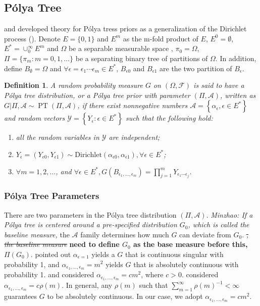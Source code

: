 \documentclass[12pt]{article}
\newtheorem{deff}[thm]{Definition}
\newcommand{\polya}{P\'{o}lya}
\DeclareMathOperator{\pt}{PT}
\begin{document}
\subsection{\polya{} Tree}
\citep{lavine1992, lavine1994} and \citep{mauldin1992} developed theory for
\polya{} tress priors as a generalization of the Dirichlet
process (\citep{ferguson1974}). Denote $E=\{0,1\}$ and $E^m$ as the m-fold
product of $E$, $E^0= \emptyset$, $E^{*} = \cup_0^{\infty} E^m$ and $\Omega$ be a separable
measurable space , $\pi_0 = \Omega$, $\Pi= \{ \pi_m: m=0,1, \ldots \}
$ be a separating binary tree of partitions of $\Omega$. In addition,
define $B_{\emptyset} = \Omega$ and $\forall \epsilon=\epsilon_1\cdots
\epsilon_m \in E^{*}$, $B_{\epsilon 0}$ and $B_{\epsilon 1}$ are the
two partition of $B_{\epsilon}$.
\begin{deff}
  A random probability measure $G$ on $(\Omega, \mathcal{F})$ is said to
  have a \polya{} tree distribution, or a \polya{} tree prior with
  parameter $(\Pi, \mathcal{A})$, written as $G|\Pi, \mathcal{A} \sim
  \pt (\Pi, \mathcal{A})$, if there exist nonnegative numbers
  $\mathcal{A}= \left\{ \alpha_{\epsilon}, \epsilon \in E^{*} \right\}$
  and random vectors $\mathcal{Y} = \left\{ Y_{\epsilon} : \epsilon \in
    E^{*} \right\}$ such that the following hold:
  \begin{enumerate}
  \item\label{item:1} all the random variables in $\mathcal{Y}$ are independent;
  \item $Y_{\epsilon}= (Y_{\epsilon 0} , Y_{\epsilon 1}) \sim
    \mathrm{Dirichlet}(\alpha_{\epsilon 0 }, \alpha_{\epsilon 1}),
    \forall \epsilon \in E^{*}$;
  \item $\forall m=1,2, \ldots$, and $\forall \epsilon \in E^{*},
    G(B_{\epsilon_{1}, \ldots, \epsilon_m}) = \prod_{j=1}^m Y_{\epsilon_1
      \cdots \epsilon_j}$.
  \end{enumerate}
\end{deff}

\subsubsection{\polya{} Tree Parameters}
There are two parameters in the \polya{} tree distribution $(\Pi,
\mathcal{A})$. {\it Minzhao: If a \polya{} tree is centered around a
  pre-specified distribution $G_0$, which is called the baseline
  measure, } the $\mathcal{A}$ family determines how much $G$ can
deviate from $G_0$. {\it \sout{ , the baseline measure}} {\bf need to define $G_0$ as
  the base measure before this, $\Pi(G_0)$}. \citep{ferguson1974} pointed out
$\alpha_{\epsilon = 1} $ yields a $G$ that is continuous singular with
probability 1, and $\alpha_{\epsilon_1, \ldots, \epsilon_m} = m^2$
yields $G$ that is absolutely continuous with probability 1. \citep{walker1999}
and \citep{paddock1999} considered $\alpha_{\epsilon_1,
  \ldots, \epsilon_m} = cm^2$, where $c > 0$. \citep{berger2001}
considered $\alpha_{\epsilon_1, \ldots, \epsilon_m} = c
\rho(m)$. In general, any $\rho(m) $ such that $\sum_{m=1}^{\infty}
\rho(m)^{-1} < \infty$ guarantees $G$ to be absolutely continuous. In
our case, we adopt $\alpha_{\epsilon_1, \ldots, \epsilon_m} = cm^2$.
\end{document}
